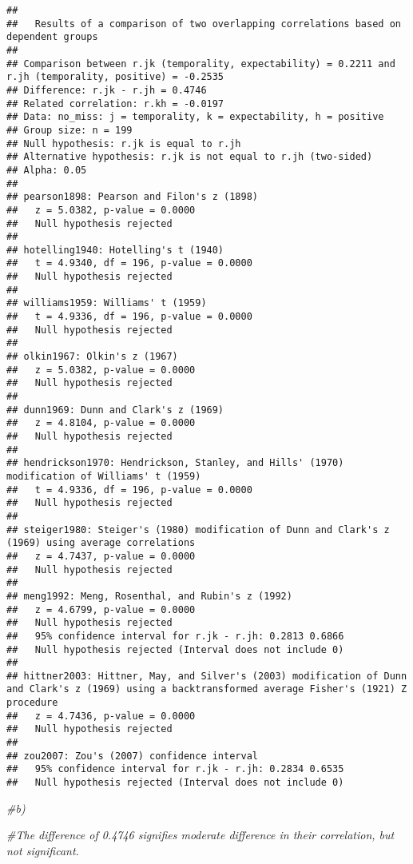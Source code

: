 \documentclass[
]{article}
\newenvironment{Shaded}{\begin{snugshade}}{\end{snugshade}}
\newcommand{\CommentTok}[1]{\textcolor[rgb]{0.56,0.35,0.01}{\textit{#1}}}
\begin{document}
\begin{verbatim}
## 
##   Results of a comparison of two overlapping correlations based on dependent groups
## 
## Comparison between r.jk (temporality, expectability) = 0.2211 and r.jh (temporality, positive) = -0.2535
## Difference: r.jk - r.jh = 0.4746
## Related correlation: r.kh = -0.0197
## Data: no_miss: j = temporality, k = expectability, h = positive
## Group size: n = 199
## Null hypothesis: r.jk is equal to r.jh
## Alternative hypothesis: r.jk is not equal to r.jh (two-sided)
## Alpha: 0.05
## 
## pearson1898: Pearson and Filon's z (1898)
##   z = 5.0382, p-value = 0.0000
##   Null hypothesis rejected
## 
## hotelling1940: Hotelling's t (1940)
##   t = 4.9340, df = 196, p-value = 0.0000
##   Null hypothesis rejected
## 
## williams1959: Williams' t (1959)
##   t = 4.9336, df = 196, p-value = 0.0000
##   Null hypothesis rejected
## 
## olkin1967: Olkin's z (1967)
##   z = 5.0382, p-value = 0.0000
##   Null hypothesis rejected
## 
## dunn1969: Dunn and Clark's z (1969)
##   z = 4.8104, p-value = 0.0000
##   Null hypothesis rejected
## 
## hendrickson1970: Hendrickson, Stanley, and Hills' (1970) modification of Williams' t (1959)
##   t = 4.9336, df = 196, p-value = 0.0000
##   Null hypothesis rejected
## 
## steiger1980: Steiger's (1980) modification of Dunn and Clark's z (1969) using average correlations
##   z = 4.7437, p-value = 0.0000
##   Null hypothesis rejected
## 
## meng1992: Meng, Rosenthal, and Rubin's z (1992)
##   z = 4.6799, p-value = 0.0000
##   Null hypothesis rejected
##   95% confidence interval for r.jk - r.jh: 0.2813 0.6866
##   Null hypothesis rejected (Interval does not include 0)
## 
## hittner2003: Hittner, May, and Silver's (2003) modification of Dunn and Clark's z (1969) using a backtransformed average Fisher's (1921) Z procedure
##   z = 4.7436, p-value = 0.0000
##   Null hypothesis rejected
## 
## zou2007: Zou's (2007) confidence interval
##   95% confidence interval for r.jk - r.jh: 0.2834 0.6535
##   Null hypothesis rejected (Interval does not include 0)
\end{verbatim}

\begin{Shaded}
\begin{Highlighting}[]
\CommentTok{#b)}

\CommentTok{#The difference of 0.4746 signifies moderate difference in their correlation, but not significant.}
\end{Highlighting}
\end{Shaded}
\end{document}
